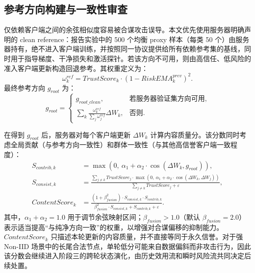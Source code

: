 \documentclass[11pt, a4paper, UTF8, fontset=fandol]{ctexart}
\begin{document}
\subsection{参考方向构建与一致性审查}
仅依赖客户端之间的余弦相似度容易被合谋攻击误导。本文优先使用服务器明确声明的 clean reference：报告实验中的 500 个均衡 proxy 样本（每类 50 个）由服务器持有，绝不进入客户端训练，并按照同一协议提供给所有依赖参考集的基线，同时用于指导梯度、干净损失和激活探针。若该方向不可用，则由高信任、低风险的准入客户端更新构造回退参考。其权重定义为：
\begin{equation}
    \omega_{k}^{ref} = TrustScore_{k} \cdot (1 - RiskEMA_{k}^{prev})^{2}.
\end{equation}
最终参考方向 $g_{root}$ 为：
\begin{equation}
    g_{root}=
    \begin{cases}
        g_{root\_clean},                                                      & \text{若服务器验证集方向可用}, \\
        \sum_{k} \frac{\omega_{k}^{ref}}{\sum_j \omega_{j}^{ref}} \Delta W_k, & \text{否则}.
    \end{cases}
\end{equation}

在得到 $g_{root}$ 后，服务器对每个客户端更新 $\Delta W_k$ 计算内容质量分。该分数同时考虑全局贡献（与参考方向一致性）和群体一致性（与其他高信誉客户端一致程度）：
\begin{align}
    S_{contrib,k}    & = \max\left(0,\ \alpha_{1} + \alpha_{2} \cdot \cos(\Delta W_{k}, g_{root})\right),                                                                                             \\
    S_{consist,k}    & = \frac{\sum_{j\neq k} TrustScore_{j} \cdot \max\left(0,\ \alpha_{1} + \alpha_{2} \cdot \cos(\Delta W_{k}, \Delta W_{j})\right)}{\sum_{j\neq k} TrustScore_{j} + \varepsilon}, \\
    ContentScore_{k} & = \frac{(1 + \beta_{fusion}^{2}) \cdot S_{consist,k} \cdot S_{contrib,k}}{\beta_{fusion}^{2}\cdot S_{consist,k} + S_{contrib,k} + \varepsilon}.
\end{align}
其中，$\alpha_1+\alpha_2=1.0$ 用于调节余弦映射区间；$\beta_{fusion}>1.0$（默认 $\beta_{fusion}=2.0$）表示适当提高“与纯净方向一致”的权重，以增强对合谋偏移的抑制能力。$ContentScore_k$ 只描述本轮更新的内容质量，并不直接等同于永久信誉。对于强 Non-IID 场景中的长尾合法节点，单轮低分可能来自数据偏斜而非攻击行为，因此该分数会继续进入阶段三的跨轮状态演化，由历史效用流和瞬时风险流共同决定后续处置。
\end{document}
